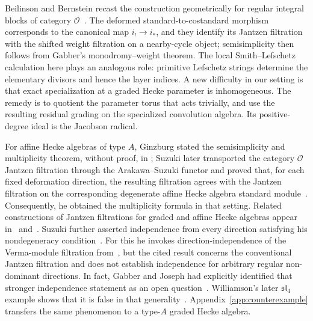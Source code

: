 \documentclass[10pt,a4paper]{amsart}
\begin{document}
Beilinson and Bernstein recast the construction geometrically for regular
integral blocks of category $\mathcal O$~\cite{BeilinsonBernstein}.  The
deformed standard-to-costandard morphism corresponds to the canonical map
$i_!\to i_*$, and they identify its Jantzen filtration with the shifted
weight filtration on a nearby-cycle object; semisimplicity then follows from
Gabber's monodromy--weight theorem.  The local Smith--Lefschetz calculation here
plays an analogous role: primitive Lefschetz strings determine the
elementary divisors and hence the layer indices.  A new difficulty in our setting is that
exact specialization at a  graded Hecke parameter is
inhomogeneous.  The remedy is to quotient the parameter torus that acts trivially, and use the resulting residual grading on the specialized
convolution algebra. Its positive-degree ideal is the Jacobson radical.

For affine Hecke algebras of type $A$, Ginzburg
stated the semisimplicity and multiplicity theorem, without proof, in
\cite[Theorem~2.6.2]{GinzburgICM}; Suzuki later transported the category
$\mathcal O$ Jantzen filtration through the Arakawa--Suzuki functor and
proved that, for each fixed deformation direction, the resulting filtration
agrees with the Jantzen filtration on the corresponding degenerate affine
Hecke algebra standard module~\cite[Theorem~4.3.5]{Suzuki}.  Consequently, he obtained the multiplicity formula in that setting.
Related constructions of Jantzen filtrations for graded and affine Hecke
algebras appear in~\cite{Chan} and~\cite{FujitaHernandez}.
Suzuki further asserted independence from every direction satisfying his
nondegeneracy condition~\cite[Proposition~5.3.2]{Suzuki}.  For this he invokes
direction-independence of the Verma-module filtration from~\cite{Barbasch}, but
the cited result concerns the conventional Jantzen filtration and does not
establish independence for arbitrary regular non-dominant directions.
In fact, Gabber and Joseph had explicitly identified that stronger
independence statement as an open question~\cite[Section~4.2]{GabberJoseph}.
Williamson's later $\mathfrak{sl}_4$ example shows that it is false in that
generality~\cite[Sections~1.4 and~8.4]{WilliamsonLocal}.  %
Appendix~\ref{app:counterexample} transfers the same phenomenon to a type-$A$
graded Hecke algebra. 
\end{document}
